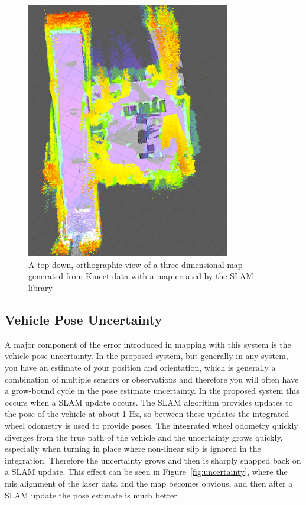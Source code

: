 \documentclass[12pt]{report}
\begin{document}
\begin{figure}[ht]
  \centering
  \includegraphics[width=3.5in,keepaspectratio]{slamvsoctree.pdf}
  \caption{A top down, orthographic view of a three dimensional map generated from Kinect data with a map created by the SLAM library}
  \label{fig:slamvsoctree}
\end{figure}

\subsection{Vehicle Pose Uncertainty}
A major component of the error introduced in mapping with this system is the vehicle pose uncertainty.  In the proposed system, but generally in any system, you have an estimate of your position and orientation, which is generally a combination of multiple sensors or observations and therefore you will often have a grow-bound cycle in the pose estimate uncertainty.  In the proposed system this occurs when a SLAM update occurs.  The SLAM algorithm provides updates to the pose of the vehicle at about 1 Hz, so between these updates the integrated wheel odometry is used to provide poses.  The integrated wheel odometry quickly diverges from the true path of the vehicle and the uncertainty grows quickly, especially when turning in place where non-linear slip is ignored in the integration.  Therefore the uncertainty grows and then is sharply snapped back on a SLAM update.  This effect can be seen in Figure~\ref{fig:uncertainty}, where the mis alignment of the laser data and the map becomes obvious, and then after a SLAM update the pose estimate is much better.
\end{document}
